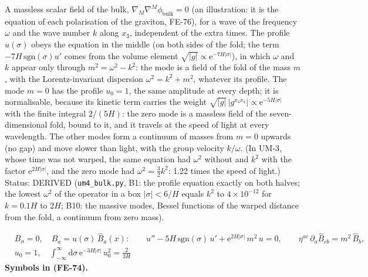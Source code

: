 \documentclass[
  10pt,
]{article}
\begin{document}
A massless scalar field of the bulk,
\(\nabla_M\nabla^M\phi_{\mathrm{bulk}} = 0\) (an illustration: it is the
equation of each polarisation of the graviton, FE-76), for a wave of the
frequency \(\omega\) and the wave number \(k\) along \(x_3\),
independent of the extra times. The profile \(u(\sigma)\) obeys the
equation in the middle (on both sides of the fold; the term
\(-7H\,\mathrm{sgn}(\sigma)u'\) comes from the volume element
\(\sqrt{\lvert g\rvert} \propto \mathrm{e}^{-7H\lvert\sigma\rvert}\)),
in which \(\omega\) and \(k\) appear only through
\(m^2 = \omega^2 - k^2\): the mode is a field of the fold of the mass
\(m\), with the Lorentz-invariant dispersion \(\omega^2 = k^2 + m^2\),
whatever its profile. The mode \(m = 0\) has the profile \(u_0 = 1\),
the same amplitude at every depth; it is normalisable, because its
kinetic term carries the weight
\(\sqrt{\lvert g\rvert}\,\lvert g^{x_4x_4}\rvert \propto \mathrm{e}^{-5H\lvert\sigma\rvert}\)
with the finite integral \(2/(5H)\): the zero mode is a massless field
of the seven-dimensional fold, bound to it, and it travels at the speed
of light at every wavelength. The other modes form a continuum of masses
from \(m = 0\) upwards (no gap) and move slower than light, with the
group velocity \(k/\omega\). (In UM-3, whose time was not warped, the
same equation had \(\omega^2\) without and \(k^2\) with the factor
\(\mathrm{e}^{2H\lvert\sigma\rvert}\), and the zero mode had
\(\omega^2 = \frac32k^2\): 1.22 times the speed of light.) Status:
DERIVED (\texttt{um4\_bulk.py}, B1: the profile equation exactly on both
halves; the lowest \(\omega^2\) of the operator in a box
\(\lvert\sigma\rvert < 6/H\) equals \(k^2\) to \(4\times10^{-12}\) for
\(k = 0.1H\) to \(2H\); B10: the massive modes, Bessel functions of the
warped distance from the fold, a continuum from zero mass).

\[
\begin{aligned}
&B_\sigma = 0,\quad B_a = u(\sigma)\,\hat B_a(x):\qquad
u'' - 5H\,\mathrm{sgn}(\sigma)\,u' + \mathrm{e}^{2H\lvert\sigma\rvert}\,m^2\,u = 0,\qquad
\eta^{ac}\,\partial_a\hat B_{cb} = m^2\,\hat B_b,\\
&u_0 = 1,\quad \int_{-\infty}^{\infty}\mathrm{d}\sigma\,\mathrm{e}^{-3H\lvert\sigma\rvert}\,u_0^2 = \frac{2}{3H}
\end{aligned} \tag{FE-74}
\] \textbf{Symbols in (FE-74).}
\end{document}
